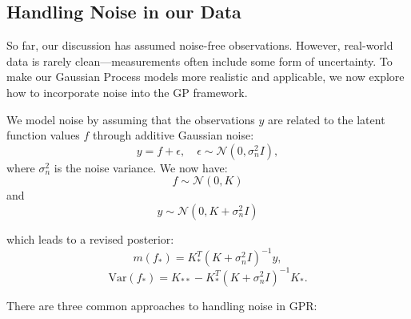 \documentclass{article}
\begin{document}
\subsection{Handling Noise in our Data}
\label{sec: Handlingnoise}

So far, our discussion has assumed noise-free observations. However, real-world data is rarely clean—measurements often include some form of uncertainty. To make our Gaussian Process models more realistic and applicable, we now explore how to incorporate noise into the GP framework.

\bigskip

\noindent
We model noise by assuming that the observations $y$ are related to the latent function values $f$ through additive Gaussian noise:
\[
y = f + \epsilon, \quad \epsilon \sim \mathcal{N}(0, \sigma_n^2 I),
\]
where $\sigma_n^2$ is the noise variance. We now have:
\[
f \sim \mathcal{N}(0, K)
\]
and 
\begin{equation}\label{eq: 4}
y \sim \mathcal{N}(0, K+\sigma_n^2 I)
\end{equation}

\bigskip

which leads to a revised posterior:
\[
m(f_*) = K_*^T (K + \sigma_n^2 I)^{-1} y,
\]
\[
\text{Var}(f_*) = K_{**} - K_*^T (K + \sigma_n^2 I)^{-1} K_*.
\]

\bigskip

\noindent
There are three common approaches to handling noise in GPR:
\end{document}
